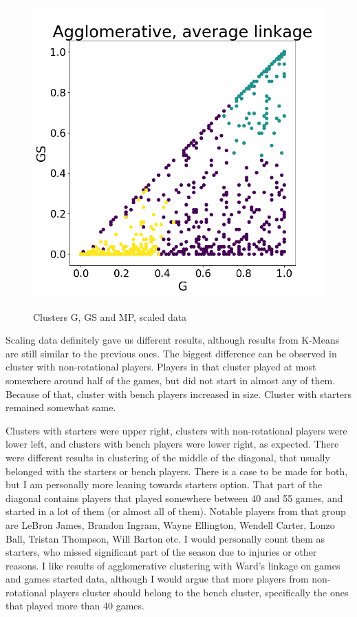 \documentclass[a4paper]{article}
\begin{document}
\begin{figure}
\begin{minipage}{.22\textwidth}
  \label{fig:ward_g_gs_mp_scaled}
\end{minipage}
\begin{minipage}{.22\textwidth}
  \centering
  \includegraphics[scale=0.14]{average_link_g_gs_mp_scaled.png}
  \label{fig:average_g_gs_mp_scaled}
\end{minipage}
\caption{Clusters G, GS and MP, scaled data}
\label{plt:clust_g_gs_mp_k3_scaled}
\end{figure}

Scaling data definitely gave us different results, although results from K-Means are still similar to the previous ones. The biggest difference can be observed in cluster with non-rotational players. Players in that cluster played at most somewhere around half of the games, but did not start in almost any of them. Because of that, cluster with bench players increased in size. Cluster with starters remained somewhat same.

Clusters with starters were upper right, clusters with non-rotational players were lower left, and clusters with bench players were lower right, as expected. There were different results in clustering of the middle of the diagonal, that usually belonged with the starters or bench players. There is a case to be made for both, but I am personally more leaning towards starters option. That part of the diagonal contains players that played somewhere between 40 and 55 games, and started in a lot of them (or almost all of them). Notable players from that group are LeBron James, Brandon Ingram, Wayne Ellington, Wendell Carter, Lonzo Ball, Tristan Thompson, Will Barton etc. I would personally count them as starters, who missed significant part of the season due to injuries or other reasons. I like results of agglomerative clustering with Ward's linkage on games and games started data, although I would argue that more players from non-rotational players cluster should belong to the bench cluster, specifically the ones that played more than 40 games.
\end{document}
